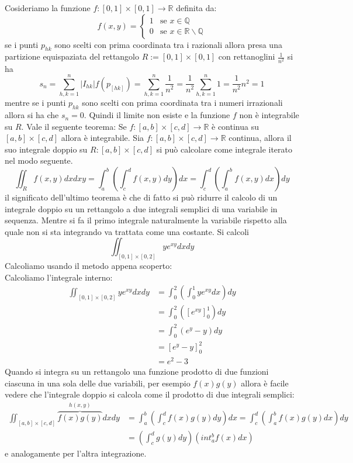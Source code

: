 \documentclass[a4paper]{article}
\numberwithin{equation}{subsection}
\begin{document}
\ex{}
{
Cosideriamo la funzione $f : [0,1] \times [0,1] \rightarrow \mathbb{R}$ definita da:
 \[f(x,y) = \begin{cases}
    1 & \text{se } x \in \mathbb{Q}\\
    0 & \text{se } x \in \mathbb{R} \backslash \mathbb{Q}
 \end{cases}\]
 se i punti $p_{hk}$ sono scelti con prima coordinata tra i razionali allora presa una partizione 
 equispaziata del rettangolo $R := [0,1] \times [0,1]$ con rettanoglini $\frac{1}{n^2}$ si ha
 \[s_n = \sum_{h,k = 1}^{n} |I_{hk}|f(p_[hk]) = \sum_{h,k=1}^{n}\frac{1}{n^2}= \frac{1}{n^2}\sum_{h,k=1}^{n}1 = \frac{1}{n^2}n^2 = 1\] 
mentre se i punti $p_{hk}$ sono scelti con prima coordinata tra i numeri irrazionali allora si ha che $s_n = 0$.
Quindi il limite non esiste e la funzione $f$ non è integrabile su $R$.
}
Vale il seguente teorema:
\thm{}
{
    Se $f : [a,b] \times [c,d] \rightarrow \mathbb{R}$ è continua su $[a,b] \times [c,d]$ allora è integrabile.
}
{
 Sia $f: [a,b] \times [c,d] \rightarrow \mathbb{R}$ continua, allora il suo integrale doppio su $R: [a,b] \times [c,d]$ si può calcolare come integrale iterato
 nel modo seguente.
 \[\iint_{R} f(x,y)dxdxy = \int_{a}^{b} \left(\int_{c}^{d} f(x,y)dy\right)dx = \int_{c}^d\left(\int_a^b f(x,y)dx\right)dy\]
}
il significato dell'ultimo teorema è che di fatto si può ridurre il calcolo di un integrale doppio su un rettangolo a due integrali semplici di una variabile in sequenza.
Mentre si fa il primo integrale naturalmente la variabile rispetto alla quale non si sta integrando va trattata come una costante. 
\ex{}
{
    Si calcoli 
    \[\iint_{[0,1] \times [0,2]} ye^{xy}dxdy\]
    Calcoliamo usando il metodo appena scoperto:
    \[\]
    Calcoliamo l'integrale interno:
    \[\begin{aligned}
        \iint_{[0,1] \times [0,2]} ye^{xy}dxdy &= \int_{0}^{2}\left(\int_{0}^{1} ye^{xy}dx\right)dy\\
        &= \int_0^2 \left([e^{xy}]_0^1\right)dy\\
        &= \int_0^2 (e^y - y)dy\\
        &= \left[e^y - y\right]_0^2\\
        &= e^2 - 3
    \end{aligned}\]
}
{
    Quando si integra su un rettangolo una funzione prodotto di due funzioni ciascuna in una sola delle due variabili,
    per esempio $f(x)g(y)$ allora è facile vedere che l'integrale doppio si calcola come il prodotto di due integrali semplici:
    \[
    \begin{aligned}
        \iint_{[a,b] \times [c,d]} \overbrace{f(x)g(y)}^{h(x,y)} dxdy &= \int_{a}^{b} \left(\int_{c}^{d} f(x)g(y)dy\right)dx = \int_{c}^{d} \left(\int_{a}^{b} f(x)g(y)dx\right)dy\\
        &= \left(\int_c^d g(y)dy\right)\left(int_a^b f(x)dx\right)
    \end{aligned} \]
    e analogamente per l'altra integrazione.
}
\end{document}

